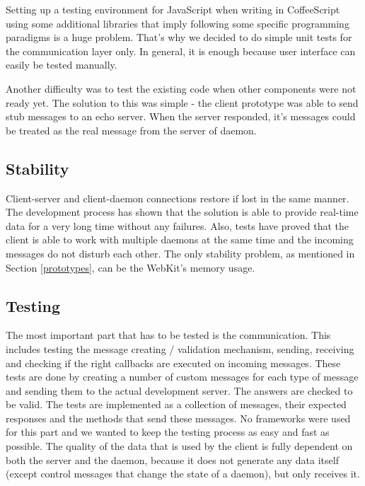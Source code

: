 \documentclass{l3proj}
\begin{document}
Setting up a testing environment for JavaScript when writing in CoffeeScript using some additional libraries that imply following some specific programming paradigms is a huge problem. That's why we decided to do simple unit tests for the communication layer only. In general, it is enough because user interface can easily be tested manually.

Another difficulty was to test the existing code when other components were not ready yet. The solution to this was simple - the client prototype was able to send stub messages to an echo server. When the server responded, it's messages could be treated as the real message from the server of daemon.


\subsection{Stability}

Client-server and client-daemon connections restore if lost in the same manner. The development process has shown that the solution is able to provide real-time data for a very long time without any failures. Also, tests have proved that the client is able to work with multiple daemons at the same time and the incoming messages do not disturb each other. The only stability problem, as mentioned in Section \ref{prototypes}, can be the WebKit's memory usage.

\subsection{Testing}

The most important part that has to be tested is the communication. This includes testing the message creating / validation mechanism, sending, receiving and checking if the right callbacks are executed on incoming messages. These tests are done by creating a number of custom messages for each type of message and sending them to the actual development server. The answers are checked to be valid. The tests are implemented as a collection of messages, their expected responses and the methods that send these messages. No frameworks were used for this part and we wanted to keep the testing process as easy and fast as possible. The quality of the data that is used by the client is fully dependent on both the server and the daemon, because it does not generate any data itself (except control messages that change the state of a daemon), but only receives it.


\end{document}
